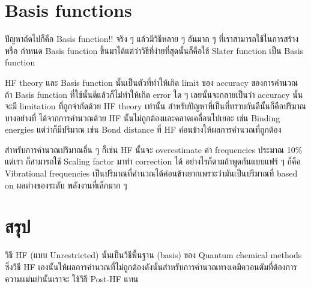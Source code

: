 \section{Basis functions} 

ปัญหาถัดไปก็คือ Basis function!! จริง ๆ แล้วมีวิธีหลาย ๆ อันมาก ๆ ที่เราสามารถใช้ในการสร้างหรือ%
กำหนด Basis function ขึ้นมาได้แต่ว่าวิธีที่ง่ายที่สุดนั้นก็คือใช้ Slater function เป็น Basis function 

HF theory และ Basis function นั้นเป็นตัวที่ทำให้เกิด limit ของ accuracy ของการคำนวณ 
ถ้า Basis function ที่ใช้นั้นดีแล้วก็ไม่ทำให้เกิด error ใด ๆ เลยนั้นจะกลายเป็นว่า accuracy นั้นจะมี 
limitation ที่ถูกจำกัดด้วย HF theory เท่านั้น สำหรับปัญหาที่เป็นที่ทราบกันดีนั้นก็คือปริมาณบางอย่างที่%
ได้จากการคำนวณด้วย HF นั้นไม่ถูกต้องและคลาดเคลื่อนไปเยอะ เช่น Binding energies แต่ว่าก็มีปริมาณ 
เช่น Bond distance ที่ HF ค่อนข้างให้ผลการคำนวณที่ถูกต้อง

สำหรับการคำนวณปริมาณอื่น ๆ ก็เช่น HF นั้นจะ overestimate ค่า frequencies ประมาณ 10\% แต่เรา%
ก็สามารถใช้ Scaling factor มาทำ correction ได้ อย่างไรก็ตามถ้าพูดกันแบบแฟร์ ๆ ก็คือ Vibrational 
frequencies เป็นปริมาณที่คำนวณได้ค่อนข้างยากเพราะว่ามันเป็นปริมาณที่ based on ผลต่างของระดับ%
พลังงานที่เล็กมาก ๆ 

\section{สรุป}

วิธี HF (แบบ Unrestricted) นั้นเป็นวิธีพื้นฐาน (basis) ของ Quantum chemical methods ซึ่งวิธี 
HF เองนั้นให้ผลการคำนวณที่ไม่ถูกต้องดังนั้นสำหรับการคำนวณทางเคมีควอนตัมที่ต้องการความแม่นยำนั้นเราจะ%
ใช้วิธี Post-HF แทน 
